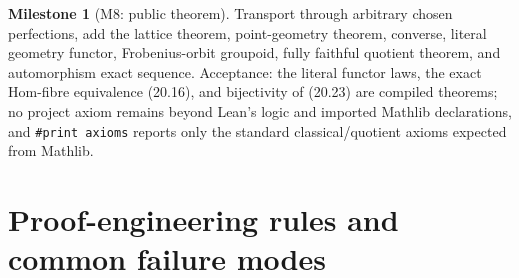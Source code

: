\documentclass[11pt,oneside]{article}
\theoremstyle{definition}
\newtheorem{milestone}[theorem]{Milestone}
\theoremstyle{remark}
\newcommand{\lean}[1]{\nolinkurl{#1}}
\begin{document}
\begin{milestone}[M8: public theorem]
Transport through arbitrary chosen perfections, add the lattice theorem, point-geometry
theorem, converse, literal geometry functor, Frobenius-orbit groupoid, fully faithful
quotient theorem, and automorphism exact sequence.  Acceptance: the literal functor laws,
the exact Hom-fibre equivalence (20.16), and bijectivity of (20.23) are compiled theorems;
no project axiom remains beyond Lean's logic and imported Mathlib declarations, and
\lean{\#print axioms} reports only the standard classical/quotient axioms expected from
Mathlib.
\end{milestone}

\section{Proof-engineering rules and common failure modes}
\end{document}
